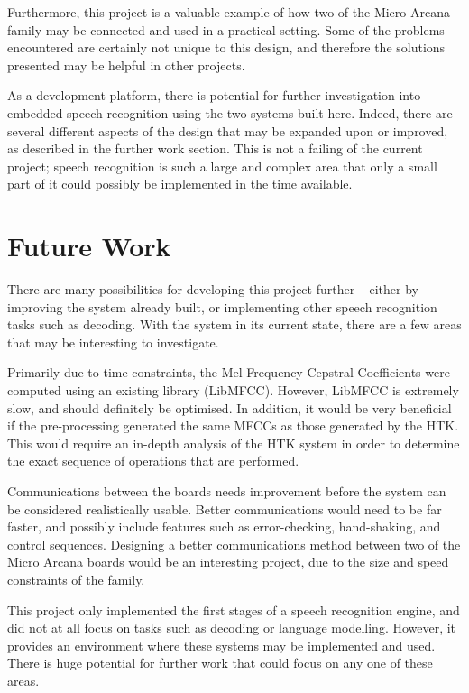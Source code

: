 	Furthermore, this project is a valuable example of how two of the Micro Arcana family may be connected and used in a practical setting.  Some of the problems encountered are certainly not unique to this design, and therefore the solutions presented may be helpful in other projects.

	As a development platform, there is potential for further investigation into embedded speech recognition using the two systems built here.  Indeed, there are several different aspects of the design that may be expanded upon or improved, as described in the further work section.  This is not a failing of the current project; speech recognition is such a large and complex area that only a small part of it could possibly be implemented in the time available.


\section{Future Work} %
\label{sec:future_work}
	There are many possibilities for developing this project further -- either by improving the system already built, or implementing other speech recognition tasks such as decoding.  With the system in its current state, there are a few areas that may be interesting to investigate.

	Primarily due to time constraints, the Mel Frequency Cepstral Coefficients were computed using an existing library (LibMFCC).  However, LibMFCC is extremely slow, and should definitely be optimised.  In addition, it would be very beneficial if the pre-processing generated the same MFCCs as those generated by the HTK.  This would require an in-depth analysis of the HTK system in order to determine the exact sequence of operations that are performed.

	Communications between the boards needs improvement before the system can be considered realistically usable.  Better communications would need to be far faster, and possibly include features such as error-checking, hand-shaking, and control sequences.  Designing a better communications method between two of the Micro Arcana boards would be an interesting project, due to the size and speed constraints of the family.

	This project only implemented the first stages of a speech recognition engine, and did not at all focus on tasks such as decoding or language modelling.  However, it provides an environment where these systems may be implemented and used.  There is huge potential for further work that could focus on any one of these areas.


